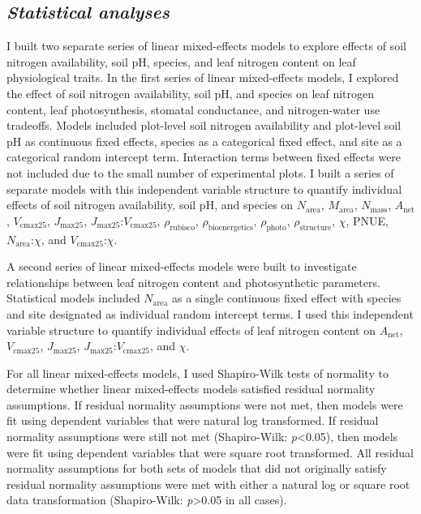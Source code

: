 \subsection{\textit{Statistical analyses}}
\noindent I built two separate series of linear mixed-effects models to explore effects of soil nitrogen availability, soil pH, species, and leaf nitrogen content on leaf physiological traits. In the first series of linear mixed-effects models, I explored the effect of soil nitrogen availability, soil pH, and species on leaf nitrogen content, leaf photosynthesis, stomatal conductance, and nitrogen-water use tradeoffs. Models included plot-level soil nitrogen availability and plot-level soil pH as continuous fixed effects, species as a categorical fixed effect, and site as a categorical random intercept term. Interaction terms between fixed effects were not included due to the small number of experimental plots. I built a series of separate models with this independent variable structure to quantify individual effects of soil nitrogen availability, soil pH, and species on $N_\mathrm{area}$, $M_\mathrm{area}$, $N_\mathrm{mass}$, $A_\mathrm{net}$, $V_\mathrm{cmax25}$, $J_\mathrm{max25}$, $J_\mathrm{max25}$:$V_\mathrm{cmax25}$, $\rho_\mathrm{rubisco}$, $\rho_\mathrm{bioenergetics}$, $\rho_\mathrm{photo}$, $\rho_\mathrm{structure}$, $\chi$, PNUE, $N_\mathrm{area}$:$\chi$, and $V_\mathrm{cmax25}$:$\chi$.

A second series of linear mixed-effects models were built to investigate relationships between leaf nitrogen content and photosynthetic parameters. Statistical models included $N_\mathrm{area}$ as a single continuous fixed effect with species and site designated as individual random intercept terms. I used this independent variable structure to quantify individual effects of leaf nitrogen content on $A_\mathrm{net}$, $V_\mathrm{cmax25}$, $J_\mathrm{max25}$, $J_\mathrm{max25}$:$V_\mathrm{cmax25}$, and $\chi$.

For all linear mixed-effects models, I used Shapiro-Wilk tests of normality to determine whether linear mixed-effects models satisfied residual normality assumptions. If residual normality assumptions were not met, then models were fit using dependent variables that were natural log transformed. If residual normality assumptions were still not met (Shapiro-Wilk: \textit{p}<0.05), then models were fit using dependent variables that were square root transformed. All residual normality assumptions for both sets of models that did not originally satisfy residual normality assumptions were met with either a natural log or square root data transformation (Shapiro-Wilk: \textit{p}>0.05 in all cases).

